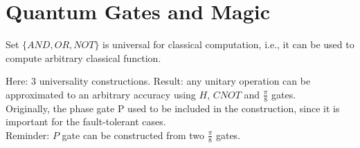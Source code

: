 \section{Quantum Gates and Magic}
\begin{example}
Set $\{AND, OR, NOT\}$ is universal for classical computation, i.e., it can be used
to compute arbitrary classical function. 
\end{example} 

Here: 3 universality constructions. Result: any unitary operation can be approximated to an arbitrary accuracy using $H$, $CNOT$ and $\frac{\pi}{8}$ gates. \\
Originally, the phase gate P used to be included in the construction, since it is important for the fault-tolerant cases. \\
Reminder: $P$ gate can be constructed from two $\frac{\pi}{8}$ gates. \\

